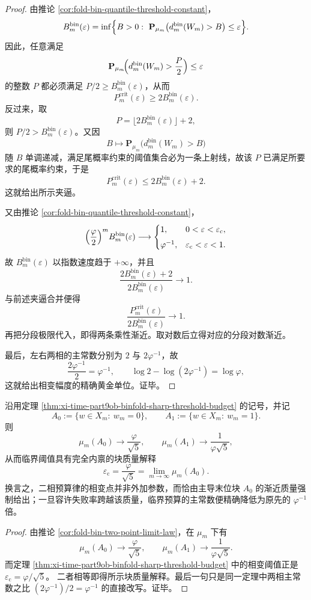 \begin{proof}
由推论 \ref{cor:fold-bin-quantile-threshold-constant}，
\[
B_m^{\mathrm{bin}}(\varepsilon)
=
\inf\Bigl\{B>0:\ 
\mathbf P_{\mu_m}\bigl(d_m^{\mathrm{bin}}(W_m)>B\bigr)\le \varepsilon
\Bigr\}.
\]
因此，任意满足
\[
\mathbf P_{\mu_m}\!\Bigl(d_m^{\mathrm{bin}}(W_m)>\frac{P}{2}\Bigr)\le \varepsilon
\]
的整数 \(P\) 都必须满足 \(P/2\ge B_m^{\mathrm{bin}}(\varepsilon)\)，从而
\[
P_m^{\mathrm{crit}}(\varepsilon)\ge 2B_m^{\mathrm{bin}}(\varepsilon).
\]
反过来，取
\[
P=\lfloor 2B_m^{\mathrm{bin}}(\varepsilon)\rfloor+2,
\]
则 \(P/2>B_m^{\mathrm{bin}}(\varepsilon)\)。又因
\[
B\longmapsto \mathbf P_{\mu_m}\bigl(d_m^{\mathrm{bin}}(W_m)>B\bigr)
\]
随 \(B\) 单调递减，满足尾概率约束的阈值集合必为一条上射线，故该 \(P\) 已满足所要求的尾概率约束，于是
\[
P_m^{\mathrm{crit}}(\varepsilon)\le 2B_m^{\mathrm{bin}}(\varepsilon)+2.
\]
这就给出所示夹逼。

又由推论 \ref{cor:fold-bin-quantile-threshold-constant}，
\[
\Bigl(\frac{\varphi}{2}\Bigr)^m B_m^{\mathrm{bin}}(\varepsilon)\longrightarrow
\begin{cases}
1,& 0<\varepsilon<\varepsilon_{\mathrm c},\\[4pt]
\varphi^{-1},& \varepsilon_{\mathrm c}<\varepsilon<1.
\end{cases}
\]
故 \(B_m^{\mathrm{bin}}(\varepsilon)\) 以指数速度趋于 \(+\infty\)，并且
\[
\frac{2B_m^{\mathrm{bin}}(\varepsilon)+2}{2B_m^{\mathrm{bin}}(\varepsilon)}\to 1.
\]
与前述夹逼合并便得
\[
\frac{P_m^{\mathrm{crit}}(\varepsilon)}{2B_m^{\mathrm{bin}}(\varepsilon)}\to 1.
\]
再把分段极限代入，即得两条乘性渐近。取对数后立得对应的分段对数渐近。

最后，左右两相的主常数分别为 \(2\) 与 \(2\varphi^{-1}\)，故
\[
\frac{2\varphi^{-1}}{2}=\varphi^{-1},
\qquad
\log 2-\log(2\varphi^{-1})=\log\varphi,
\]
这就给出相变幅度的精确黄金单位。证毕。
\end{proof}

\begin{corollary}[预算相变阈值恰等于主导末位块的渐近质量]\label{cor:xi-time-part9ob-binfold-threshold-equals-main-block-mass}
沿用定理 \ref{thm:xi-time-part9ob-binfold-sharp-threshold-budget} 的记号，并记
\[
A_0:=\{w\in X_m:\ w_m=0\},
\qquad
A_1:=\{w\in X_m:\ w_m=1\}.
\]
则
\[
\mu_m(A_0)\to \frac{\varphi}{\sqrt5},
\qquad
\mu_m(A_1)\to \frac{1}{\varphi\sqrt5},
\]
从而临界阈值具有完全内禀的块质量解释
\[
\boxed{\;
\varepsilon_{\mathrm c}
=
\frac{\varphi}{\sqrt5}
=
\lim_{m\to\infty}\mu_m(A_0).\;}
\]
换言之，二相预算律的相变点并非外加参数，而恰由主导末位块 \(A_0\) 的渐近质量强制给出；一旦容许失败率跨越该质量，临界预算的主常数便精确降低为原先的 \(\varphi^{-1}\) 倍。
\end{corollary}
\begin{proof}
由推论 \ref{cor:fold-bin-two-point-limit-law}，在 \(\mu_m\) 下有
\[
\mu_m(A_0)\to \frac{\varphi}{\sqrt5},
\qquad
\mu_m(A_1)\to \frac{1}{\varphi\sqrt5}.
\]
而定理 \ref{thm:xi-time-part9ob-binfold-sharp-threshold-budget} 中的相变阈值正是
\(
\varepsilon_{\mathrm c}=\varphi/\sqrt5
\)。
二者相等即得所示块质量解释。最后一句只是同一定理中两相主常数之比
\(
(2\varphi^{-1})/2=\varphi^{-1}
\)
的直接改写。证毕。
\end{proof}

